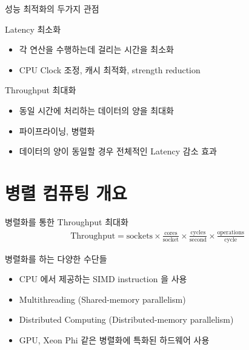 \documentclass{bredelebeamer}
\begin{document}
\begin{frame}{성능 최적화의 두가지 관점}
  \begin{block}{Latency 최소화}
    \begin{itemize}
    \item 각 연산을 수행하는데 걸리는 시간을 최소화
    \item CPU Clock 조정, 캐시 최적화, strength reduction
    \end{itemize}
  \end{block}

  \begin{exampleblock}{Throughput 최대화}
    \begin{itemize}
    \item 동일 시간에 처리하는 데이터의 양을 최대화
    \item 파이프라이닝, 병렬화
    \item 데이터의 양이 동일할 경우 전체적인 Latency 감소 효과
    \end{itemize}
  \end{exampleblock}
\end{frame}

\section{병렬 컴퓨팅 개요}
\begin{frame}{병렬화를 통한 Throughput 최대화}
  \begin{align*}
    \text{Throughput} = \text{sockets} \times
    \frac{\text{cores}}{\text{socket}} \times
    \frac{\text{cycles}}{\text{second}} \times
    \frac{\text{operations}}{\text{cycle}}
  \end{align*}

  \begin{block}{병렬화를 하는 다양한 수단들}
    \begin{itemize}
    \item CPU 에서 제공하는 SIMD instruction 을 사용
    \item Multithreading (Shared-memory parallelism)
    \item Distributed Computing (Distributed-memory parallelism)
    \item GPU, Xeon Phi 같은 병렬화에 특화된 하드웨어 사용
    \end{itemize}
  \end{block}
\end{frame}
\end{document}
